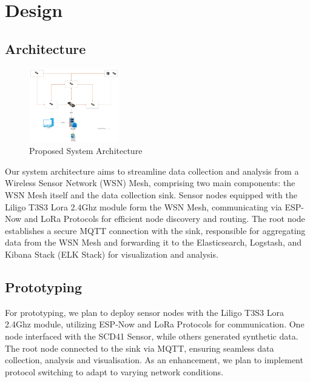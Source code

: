 \section*{Design}\label{design}


\subsection{Architecture}\label{architecture}

\begin{figure}[h]
  \begin{center}
    \includegraphics[width=0.35\textwidth]{./Figures/architecture.jpeg}
  \end{center}
  \caption{Proposed System Architecture}\label{architecture}
\end{figure}

Our system architecture aims to streamline data collection and analysis from a Wireless Sensor Network (WSN) Mesh, comprising two main components: the WSN Mesh itself and the data collection sink. Sensor nodes equipped with the Liligo T3S3 Lora 2.4Ghz module form the WSN Mesh, communicating via ESP-Now and LoRa Protocols for efficient node discovery and routing. The root node establishes a secure MQTT connection with the sink, responsible for aggregating data from the WSN Mesh and forwarding it to the Elasticsearch, Logstash, and Kibana Stack (ELK Stack) for visualization and analysis.

\subsection{Prototyping}\label{prototyping}
For prototyping, we plan to deploy sensor nodes with the Liligo T3S3 Lora 2.4Ghz module, utilizing ESP-Now and LoRa Protocols for communication. One node interfaced with the SCD41 Sensor, while others generated synthetic data. The root node connected to the sink via MQTT, ensuring seamless data collection, analysis and visualisation. As an enhancement, we plan to implement protocol switching to adapt to varying network conditions.

